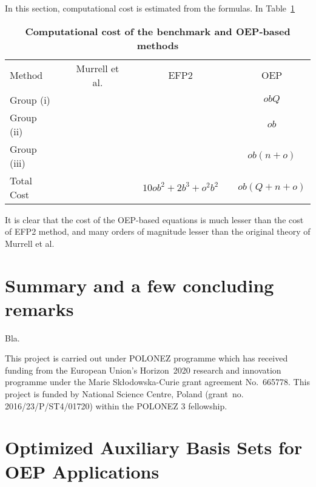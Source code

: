 In this section, computational cost is estimated from the formulas.
In
Table~\ref{t:oep-costs} 
%
{
\renewcommand{\arraystretch}{1.4}
\begin{table}[b]
\caption[Computational cost of the benchmark and OEP-based methods: calculation of coupling constant]
{{\bf Computational cost of the benchmark and OEP-based methods\footnotemark[1]}
}
\label{t:oep-costs}
\begin{ruledtabular}
\begin{tabular}{lcccccc}
Method             && Murrell et al. &&    EFP2        &&      OEP     \\ 
	\cline{1-7}
Group (i)         &&  &&        &&   $obQ$     \\
Group (ii)        &&  &&        &&   $ob$      \\
Group (iii)       &&  &&        &&   $ob(n+o)$     \\
Total Cost        &&  && $10ob^2 + 2b^3 + o^2b^2$       &&   $ob(Q+n+o)$     \\
\end{tabular}
\end{ruledtabular}
%
%
\end{table}
}
%
It is clear that the cost of the OEP\hyp{}based equations is much lesser than the cost of EFP2 method,
and many orders of magnitude lesser than the original theory of Murrell et al.


\section{\label{s:6}Summary and a few concluding remarks}

Bla.

\begin{acknowledgments}
This project is carried out under POLONEZ programme which has received funding from the European Union's
Horizon~2020 research and innovation programme under the Marie Skłodowska-Curie grant agreement 
No.~665778. This project is funded by National Science Centre, Poland 
(grant~no. 2016/23/P/ST4/01720) within the POLONEZ 3 fellowship.
\end{acknowledgments}

\appendix

\section{Optimized Auxiliary Basis Sets for OEP Applications\label{a:auxiliary-basis}}


